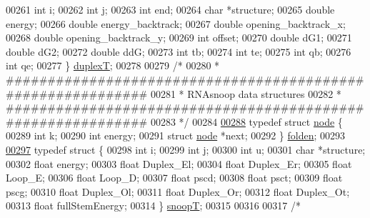 \begin{DoxyCode}
00261   \textcolor{keywordtype}{int} i;
00262   \textcolor{keywordtype}{int} j;
00263   \textcolor{keywordtype}{int} end;
00264   \textcolor{keywordtype}{char} *structure;
00265   \textcolor{keywordtype}{double} energy;
00266   \textcolor{keywordtype}{double} energy\_backtrack;
00267   \textcolor{keywordtype}{double} opening\_backtrack\_x;
00268   \textcolor{keywordtype}{double} opening\_backtrack\_y;
00269   \textcolor{keywordtype}{int} offset;
00270   \textcolor{keywordtype}{double} dG1;
00271   \textcolor{keywordtype}{double} dG2;
00272   \textcolor{keywordtype}{double} ddG;
00273   \textcolor{keywordtype}{int} tb;
00274   \textcolor{keywordtype}{int} te;
00275   \textcolor{keywordtype}{int} qb;
00276   \textcolor{keywordtype}{int} qe;
00277 \} \hyperlink{group__data__structures_structduplexT}{duplexT};
00278 
00279 \textcolor{comment}{/*}
00280 \textcolor{comment}{* ############################################################}
00281 \textcolor{comment}{* RNAsnoop data structures}
00282 \textcolor{comment}{* ############################################################}
00283 \textcolor{comment}{*/}
00284 
\hypertarget{data__structures_8h_source_l00288}{}\hyperlink{group__data__structures}{00288} \textcolor{keyword}{typedef} \textcolor{keyword}{struct }\hyperlink{group__data__structures_structnode}{node} \{
00289   \textcolor{keywordtype}{int} k;
00290   \textcolor{keywordtype}{int} energy;
00291   \textcolor{keyword}{struct }\hyperlink{group__data__structures_structnode}{node} *next;
00292 \} \hyperlink{group__data__structures_structnode}{folden};
00293 
\hypertarget{data__structures_8h_source_l00297}{}\hyperlink{group__data__structures}{00297} \textcolor{keyword}{typedef} \textcolor{keyword}{struct }\{
00298   \textcolor{keywordtype}{int} i;
00299   \textcolor{keywordtype}{int} j;
00300   \textcolor{keywordtype}{int} u;
00301   \textcolor{keywordtype}{char} *structure;
00302   \textcolor{keywordtype}{float} energy;
00303   \textcolor{keywordtype}{float} Duplex\_El;
00304   \textcolor{keywordtype}{float} Duplex\_Er;
00305   \textcolor{keywordtype}{float} Loop\_E;
00306   \textcolor{keywordtype}{float} Loop\_D;
00307   \textcolor{keywordtype}{float} pscd;
00308   \textcolor{keywordtype}{float} psct;
00309   \textcolor{keywordtype}{float} pscg;
00310   \textcolor{keywordtype}{float} Duplex\_Ol;
00311   \textcolor{keywordtype}{float} Duplex\_Or;
00312   \textcolor{keywordtype}{float} Duplex\_Ot;
00313   \textcolor{keywordtype}{float} fullStemEnergy;
00314 \} \hyperlink{group__data__structures_structsnoopT}{snoopT};
00315 
00316 
00317 \textcolor{comment}{/*}

\end{DoxyCode}
